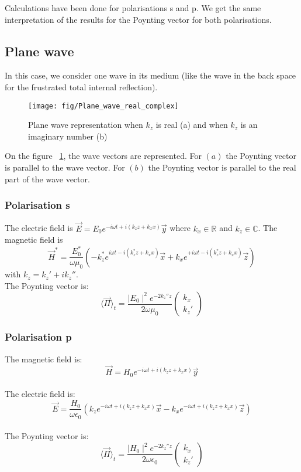 Calculations have been done for polarisations s and p. We get the same interpretation of the results for the Poynting vector for both polarisations.

\subsection{Plane wave}
In this case, we consider one wave in its medium (like the wave in the back space for the frustrated total internal reflection).\\
\begin{figure}[h!]
\texttt{[image: fig/Plane\_wave\_real\_complex]}
\caption{\label{fig:Plane_wave_real_complex}Plane  wave representation when $k_z$ is real (a) and when $k_z$ is an imaginary number (b)}
\end{figure}

On the figure ~\ref{fig:Plane_wave_real_complex}, the wave vectors are represented. For $(a)$ the Poynting vector is parallel to the wave vector. For $(b)$ the Poynting vector is parallel to the real part of the wave vector.\\
\subsubsection{Polarisation s}
The electric field is $\vec{E}=E_0e^{-i\omega t+i(k_zz+k_xx)}\vec{y}$ where $k_x\in \mathbb{R}$ and $k_z\in \mathbb{C}$.
The magnetic field is\\
$$
\vec{H}^*=\frac{E_0^*}{\omega \mu _0}(-k_z^*e^{i\omega t-i(k_z^*z+k_xx)}\vec{x}+k_xe^{+i\omega t-i(k_z^*z+k_xx)}\vec{z}) 
$$ with $k_z=k_z'+ik_z''$.\\
The Poynting vector is:
\begin{equation}
\langle \vec{\Pi} \rangle _t=\displaystyle\frac{\displaystyle\mid E_0\mid ^2e^{-2k_z''z}}{\displaystyle2\omega \mu _0}
\begin{pmatrix}
k_x\\
k_z'
\end{pmatrix}
\end{equation}

\subsubsection{Polarisation p}
The magnetic field is:\\
$$\vec{H}=H_0e^{-i\omega t+i(k_zz+k_xx)}\vec{y}$$\\
The electric field is:\\
$$\vec{E}=\frac{H_0}{\omega\epsilon_0}(k_ze^{-i\omega t+i(k_zz+k_xx)}\vec{x}-k_xe^{-i\omega t+i(k_zz+k_xx)}\vec{z})$$\\
The Poynting vector is:
\begin{equation}
\langle \vec{\Pi} \rangle _t=\displaystyle\frac{\displaystyle\mid H_0\mid ^2e^{-2k_z''z}}{\displaystyle2\omega \epsilon _0}
\begin{pmatrix}
k_x\\
k_z'
\end{pmatrix}
\end{equation}
